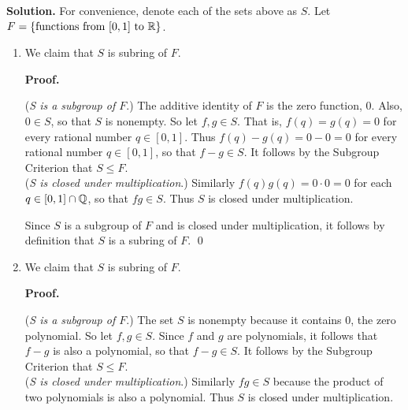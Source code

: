 \begin{enumerate}
      \textbf{Solution.} For convenience, denote each of the sets above as $S$. 
      Let $F = \{\text{functions from } [0, 1] \text{ to } \mathbb{R}\}$.

      \begin{enumerate}
         \item We claim that $S$ is subring of $F$.

               \textbf{Proof.}

               (\textit{S is a subgroup of $F$}.) The additive identity of $F$
               is the zero function, 0. Also, $0 \in S$, so that $S$ is
               nonempty. So let $f, g \in S$. That is, $f(q) = g(q) = 0$ for 
               every rational number $q \in [0, 1]$.
               Thus $f(q) - g(q) = 0 - 0 = 0$ for every rational number
               $q \in [0, 1]$, so that $f - g \in S$. It follows by the Subgroup 
               Criterion that $S \le F$. \\

               (\textit{S is closed under multiplication}.) Similarly
               $f(q)g(q) = 0\cdot0 = 0$ for each $q \in [0, 1] \cap \mathbb{Q}$, so that
               $fg \in S$. Thus $S$ is closed under multiplication.
            
               Since $S$ is a subgroup of $F$ and is closed under
               multiplication, it follows by definition that $S$ is a subring of 
               $F$. \qed
         \item We claim that $S$ is subring of $F$.

               \textbf{Proof.}

               (\textit{S is a subgroup of $F$}.) The set $S$ is nonempty
               because it contains 0, the zero polynomial. So let $f, g \in S$. 
               Since $f$ and $g$ are polynomials, it follows that $f - g$ is 
               also a polynomial, so that $f - g \in S$. It follows by the 
               Subgroup Criterion that $S \le F$. \\

               (\textit{S is closed under multiplication}.) Similarly
               $fg \in S$ because the product of two polynomials is also a
               polynomial. Thus $S$ is closed under multiplication.
            

\end{enumerate}
\end{enumerate}
